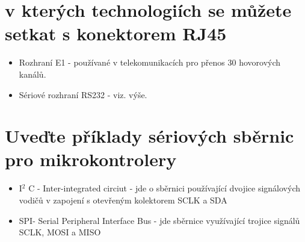 \section{v kterých technologiích se můžete setkat s konektorem RJ45}
\begin{itemize}
    \item Rozhraní E1 - používané v telekomunikacích pro přenos 30 hovorových kanálů.
    \item Sériové rozhraní RS232 - viz. výše.
\end{itemize}
\section{Uveďte příklady sériových sběrnic pro mikrokontrolery}
\begin{itemize}
    \item I$^2$ C - Inter-integrated circiut - jde o sběrnici používající dvojice signálových vodičů v zapojení s otevřeným kolektorem SCLK a SDA
    \item SPI- Serial Peripheral Interface Bus - jde sběrnice využívající trojice signálů SCLK, MOSI a MISO
\end{itemize}